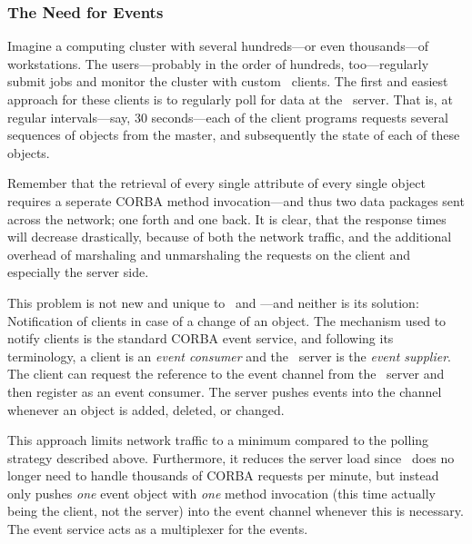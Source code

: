 \subsubsection{The Need for Events}
Imagine a computing cluster with several hundreds---or even thousands---of
workstations. The users---probably in the order of hundreds, too---regularly
submit jobs and monitor the cluster with custom \qidl\ clients. The first and
easiest approach for these clients is to regularly poll for data at the
\qidl\ server. That is, at regular intervals---say, 30 seconds---each of the
client programs requests several sequences of objects from the master, and
subsequently the state of each of these objects.

Remember that the retrieval of every single attribute of every single object 
requires a seperate CORBA method invocation---and thus two data packages sent
across the network; one forth and one back. It is clear, that the response
times will decrease drastically, because of both the network traffic, and the
additional overhead of marshaling and unmarshaling the requests on the
client and especially the server side.

This problem is not new and unique to \codine\ and \qidl---and neither is its
solution: Notification of clients in case of a change of an object. The
mechanism used to notify clients is the standard CORBA event service, and
following its terminology, a client is an \textsl{event consumer} and the
\qidl\ server is the \textsl{event supplier}. The client can request the
reference to the event channel from the \qidl\ server and then register as an
event consumer. The server pushes events into the channel whenever an object
is added, deleted, or changed.

This approach limits network traffic to a minimum compared to the polling
strategy described above. Furthermore, it reduces the server load since
\qidl\ does no longer need to handle thousands of CORBA requests per minute,
but instead only pushes \emph{one} event object with \emph{one} method
invocation (this time actually being the client, not the server)
into the event channel whenever this is necessary. The event service acts as a
multiplexer for the events.

